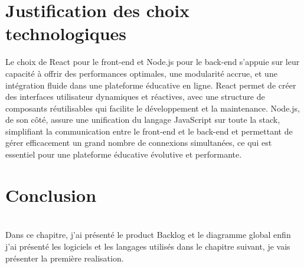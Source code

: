 \section{Justification des choix technologiques}
Le choix de React pour le front-end et Node.js pour le back-end s'appuie sur leur capacité à offrir des performances optimales, une modularité accrue, et une intégration fluide dans une plateforme éducative en ligne. React permet de créer des interfaces utilisateur dynamiques et réactives, avec une structure de composants réutilisables qui facilite le développement et la maintenance. Node.js, de son côté, assure une unification du langage JavaScript sur toute la stack, simplifiant la communication entre le front-end et le back-end et permettant de gérer efficacement un grand nombre de connexions simultanées, ce qui est essentiel pour une plateforme éducative évolutive et performante.






















\section { Conclusion}
\\
Dans ce chapitre, j’ai présenté le product Backlog et le diagramme global enfin j’ai présenté les logiciels et les langages utilisés dans le chapitre suivant, je vais présenter la première realisation.














